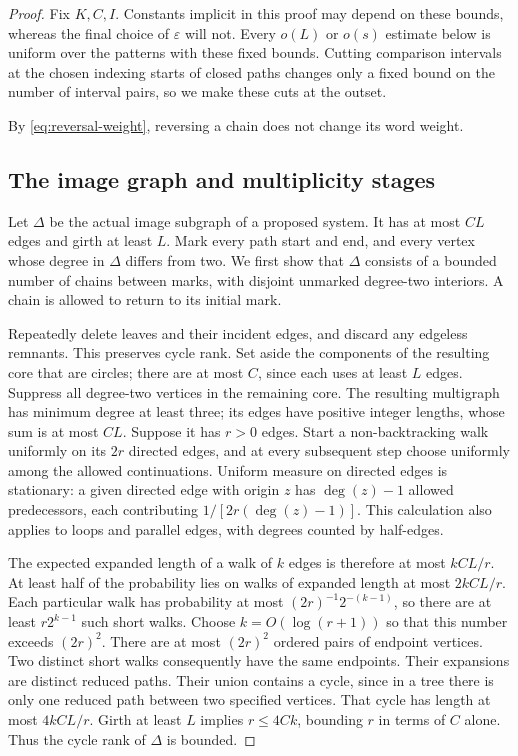 \begin{proof}
Fix \(K,C,I\).  Constants implicit in this proof may depend on these
bounds, whereas the final choice of \(\varepsilon\) will not.  Every
\(o(L)\) or \(o(s)\) estimate below is uniform over the patterns with these
fixed bounds.  Cutting comparison intervals at the chosen indexing
starts of closed paths changes only a fixed bound on the number of
interval pairs, so we make these cuts at the outset.

By \eqref{eq:reversal-weight}, reversing a chain does not change its word
weight.

\subsection*{The image graph and multiplicity stages}
Let \(\Delta\) be the actual image subgraph of a proposed system.  It has
at most \(CL\) edges and girth at least \(L\).  Mark every path start and
end, and every vertex whose degree in \(\Delta\) differs from two.  We
first show that \(\Delta\) consists of a bounded number of chains between
marks, with disjoint unmarked degree-two interiors.  A chain is allowed
to return to its initial mark.

Repeatedly delete leaves and their incident edges, and discard any edgeless
remnants. This preserves cycle rank. Set aside the components of the resulting core that are
circles; there are at most \(C\), since each uses at least \(L\) edges.
Suppress all degree-two vertices in the remaining core.  The resulting
multigraph has minimum degree at least three; its edges have positive
integer lengths, whose sum is at most \(CL\).  Suppose it has \(r>0\)
edges.  Start a non-backtracking walk uniformly on its \(2r\) directed
edges, and at every subsequent step choose uniformly among the allowed
continuations.  Uniform measure on directed edges is stationary: a
given directed edge with origin \(z\) has \(\deg(z)-1\) allowed
predecessors, each contributing
\(1/[2r(\deg(z)-1)]\).  This calculation also applies to loops and
parallel edges, with degrees counted by half-edges.

The expected expanded length of a walk of \(k\) edges is therefore at
most \(kCL/r\).  At least half of the probability lies on walks of
expanded length at most \(2kCL/r\).  Each particular walk has
probability at most \((2r)^{-1}2^{-(k-1)}\), so there are at least
\(r2^{k-1}\) such short walks.  Choose \(k=O(\log(r+1))\) so that this
number exceeds \((2r)^2\).  There are at most \((2r)^2\) ordered pairs of
endpoint vertices.  Two distinct short walks consequently have the same
endpoints.  Their expansions are distinct reduced paths.  Their union
contains a cycle, since in a tree there is only one reduced path between
two specified vertices.  That cycle has length at most \(4kCL/r\).
Girth at least \(L\) implies \(r\le4Ck\), bounding \(r\) in terms of
\(C\) alone.  Thus the cycle rank of \(\Delta\) is bounded.


\end{proof}
